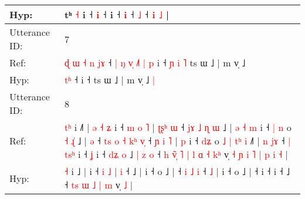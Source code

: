 \documentclass[10pt]{article}
\DeclareRobustCommand{\hl}[1]{{\textcolor{red}{#1}}}
\begin{document}
\begin{longtable}{ll}
 \\
Hyp: & \hl{}\hl{}\hl{}\hl{}\hl{}\hl{}\hl{}\hl{}\hl{}\hl{}\hl{}\hl{}\hl{}\hl{}\hl{}\hl{}\hl{}\hl{}\hl{}tʰ\hl{}\hl{}\hl{}\hl{}\hl{}\hl{}\hl{}\hl{}\hl{}\hl{}\hl{}\hl{}\hl{}\hl{}\hl{}\hl{}\hl{}\hl{} \hl{˧} i ˧\hl{}\hl{}\hl{}\hl{}\hl{} \hl{}\hl{i} ˧\hl{}\hl{}\hl{}\hl{} i ˧\hl{}\hl{}\hl{}\hl{} \hl{i} ˧\hl{}\hl{}\hl{} \hl{˩} ˧\hl{}\hl{} \hl{i} \hl{˩} |
 \\
\midrule
Utterance ID: & 7 \\
Ref: & \hl{ɖ}\hl{ }\hl{ɯ}\hl{ }\hl{˧}\hl{ }\hl{n}\hl{ }\hl{j}\hl{ɤ} ˧\hl{ }\hl{|}\hl{ }\hl{ŋ}\hl{ }\hl{v}\hl{̩}\hl{ }\hl{˩}\hl{˥}\hl{ }\hl{|}\hl{ }\hl{p} i ˧\hl{ }\hl{ɲ}\hl{ }\hl{i}\hl{ }\hl{˥} ts ɯ ˩ | m v̩ ˩\hl{}\hl{}
 \\
Hyp: & \hl{}\hl{}\hl{}\hl{}\hl{}\hl{}\hl{}\hl{}\hl{t}\hl{ʰ} ˧\hl{}\hl{}\hl{}\hl{}\hl{}\hl{}\hl{}\hl{}\hl{}\hl{}\hl{}\hl{}\hl{}\hl{} i ˧\hl{}\hl{}\hl{}\hl{}\hl{}\hl{} ts ɯ ˩ | m v̩ ˩\hl{ }\hl{|}
 \\
\midrule
Utterance ID: & 8 \\
Ref: & \hl{t}\hl{ʰ} i ˩\hl{˥} |\hl{ }\hl{ə}\hl{ }\hl{˧}\hl{ }\hl{ʑ} i ˧\hl{ }\hl{m} \hl{o} \hl{˥} |\hl{ }\hl{ʈ}\hl{ʂ}\hl{ʰ} \hl{ɯ} ˧\hl{ }\hl{j}\hl{ɤ}\hl{ }\hl{˩}\hl{ }\hl{ɳ}\hl{ }\hl{ɯ} ˩ |\hl{ }\hl{ə}\hl{ }\hl{˧}\hl{ }\hl{m} i ˧\hl{ }\hl{|}\hl{ }\hl{n} o\hl{ }\hl{˧}\hl{ }\hl{ɻ}\hl{̍} ˩ |\hl{ }\hl{ə} ˧\hl{ }\hl{t}\hl{s}\hl{ }\hl{o} \hl{˧} \hl{k}\hl{ʰ} \hl{v}\hl{̩} ˧\hl{ }\hl{ɲ}\hl{ }\hl{i} \hl{˥} |\hl{ }\hl{p} i ˧\hl{ }\hl{d}\hl{ʑ} o\hl{ }\hl{˩}\hl{ }\hl{|}\hl{ }\hl{t}\hl{ʰ}\hl{ }\hl{i} ˩\hl{˥} |\hl{ }\hl{n}\hl{ }\hl{j}\hl{ɤ} ˧\hl{ }\hl{|}\hl{ }\hl{t}\hl{s}\hl{ʰ} i ˧\hl{ }\hl{ʝ} i ˧\hl{ }\hl{d}\hl{ʑ}\hl{ }\hl{o} ˩\hl{ }\hl{|}\hl{ }\hl{z}\hl{ }\hl{o} ˧\hl{ }\hl{h}\hl{ }\hl{v}\hl{̃}\hl{̩} \hl{˥}\hl{ }\hl{|} \hl{l} \hl{ɑ} \hl{˧} \hl{k}\hl{ʰ} v̩\hl{ }\hl{˧}\hl{ }\hl{ɲ}\hl{ }\hl{i}\hl{ }\hl{˥}\hl{ }\hl{|}\hl{ }\hl{p}\hl{ }\hl{i} \hl{˧} |
 \\
Hyp: & \hl{}\hl{˧} i ˩\hl{} |\hl{}\hl{}\hl{}\hl{}\hl{}\hl{} i ˧\hl{}\hl{} \hl{i} \hl{˩} |\hl{}\hl{}\hl{}\hl{} \hl{i} ˧\hl{}\hl{}\hl{}\hl{}\hl{}\hl{}\hl{}\hl{}\hl{} ˩ |\hl{}\hl{}\hl{}\hl{}\hl{}\hl{} i ˧\hl{}\hl{}\hl{}\hl{} o\hl{}\hl{}\hl{}\hl{}\hl{} ˩ |\hl{}\hl{} ˧\hl{}\hl{}\hl{}\hl{}\hl{} \hl{i} \hl{}\hl{˩} \hl{}\hl{i} ˧\hl{}\hl{}\hl{}\hl{} \hl{˩} |\hl{}\hl{} i ˧\hl{}\hl{}\hl{} o\hl{}\hl{}\hl{}\hl{}\hl{}\hl{}\hl{}\hl{}\hl{} ˩\hl{} |\hl{}\hl{}\hl{}\hl{}\hl{} ˧\hl{}\hl{}\hl{}\hl{}\hl{}\hl{} i ˧\hl{}\hl{} i ˧\hl{}\hl{}\hl{}\hl{}\hl{} ˩\hl{}\hl{}\hl{}\hl{}\hl{}\hl{} ˧\hl{}\hl{}\hl{}\hl{}\hl{}\hl{} \hl{}\hl{t}\hl{s} \hl{ɯ} \hl{˩} \hl{|} \hl{}\hl{m} v̩\hl{}\hl{}\hl{}\hl{}\hl{}\hl{}\hl{}\hl{}\hl{}\hl{}\hl{}\hl{}\hl{}\hl{} \hl{˩} |

\end{longtable}
\end{document}
